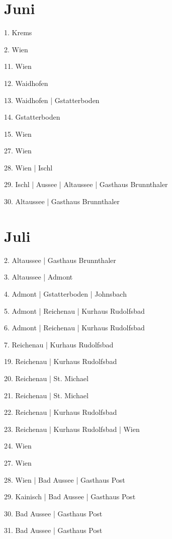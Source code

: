\documentclass[twoside=false,titlepage=false,open=any, parskip=never, fontsize=10pt, headings=small, chapterprefix=false, appendixprefix=false, DIV=15]{scrbook}
\begin{document}
\begin{multicols}{3}
            \section*{Juni}
            1. Krems\par
            2. Wien\par
            11. Wien\par
            12. Waidhofen\par
            13. Waidhofen | Gstatterboden\par
            14. Gstatterboden\par
            15. Wien\par
            27. Wien\par
            28. Wien | Ischl\par
            29. Ischl | Aussee | Altaussee | Gasthaus Brunnthaler\par
            30. Altaussee | Gasthaus Brunnthaler\par
            \section*{Juli}
            2. Altaussee | Gasthaus Brunnthaler\par
            3. Altaussee | Admont\par
            4. Admont | Gstatterboden | Johnsbach\par
            5. Admont | Reichenau | Kurhaus Rudolfsbad\par
            6. Admont | Reichenau | Kurhaus Rudolfsbad\par
            7. Reichenau | Kurhaus Rudolfsbad\par
            19. Reichenau | Kurhaus Rudolfsbad\par
            20. Reichenau | St. Michael\par
            21. Reichenau | St. Michael\par
            22. Reichenau | Kurhaus Rudolfsbad\par
            23. Reichenau | Kurhaus Rudolfsbad | Wien\par
            24. Wien\par
            27. Wien\par
            28. Wien | Bad Aussee | Gasthaus Post\par
            29. Kainisch | Bad Aussee | Gasthaus Post\par
            30. Bad Aussee | Gasthaus Post\par
            31. Bad Aussee | Gasthaus Post\par

\end{multicols}
\end{document}
